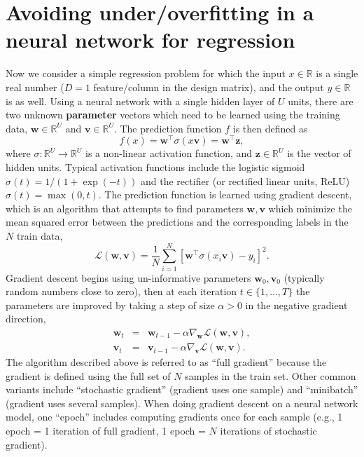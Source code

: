 \documentclass[12pt]{article}
\newcommand{\keyword}[1]{\textbf{#1}}
\begin{document}
\section{Avoiding under/overfitting in a neural network for regression}

Now we consider a simple regression problem for which the input
$x\in\mathbb R$ is a single real number ($D=1$ feature/column in the
design matrix), and the output $y\in\mathbb R$ is as well. Using a
neural network with a single hidden layer of $U$ units, there are two
unknown \keyword{parameter} vectors which need to be learned using the training
data, $\mathbf w\in \mathbb R^U$ and $\mathbf v\in \mathbb R^U$. The prediction
function $f$ is then defined as
\begin{equation}
  f(x) = \mathbf w^\intercal \sigma( x \mathbf v ) = \mathbf w^\intercal \mathbf z,
\end{equation}
where $\sigma:\mathbb R^U\rightarrow \mathbb R^U$ is a non-linear
activation function, and $\mathbf z\in \mathbb R^U$ is the vector of
hidden units. Typical activation functions include the logistic
sigmoid $\sigma(t)=1/(1+\exp(-t))$ and the rectifier (or rectified
linear units, ReLU) $\sigma(t)=\max(0, t)$. The prediction function is
learned using gradient descent, which is an algorithm that attempts to
find parameters $\mathbf w,\mathbf v$ which minimize the mean squared
error between the predictions and the corresponding labels in the $N$
train data,
\begin{equation}
  \mathcal L(\mathbf w, \mathbf v) = \frac{1}{N} \sum_{i=1}^N [ \mathbf w^\intercal \sigma( x_i \mathbf v ) - y_i ]^2. \label{eq:loss}
\end{equation}
Gradient descent begins using un-informative parameters
$\mathbf w_0,\mathbf v_0$ (typically random numbers close to zero),
then at each iteration $t\in\{1,\dots, T\}$ the parameters are
improved by taking a step of size $\alpha>0$ in the negative gradient
direction,
\begin{eqnarray}
  \mathbf w_t &=& \mathbf w_{t-1} - \alpha \nabla_{\mathbf w} \mathcal L(\mathbf w, \mathbf v),\\
  \mathbf v_t &=& \mathbf v_{t-1} - \alpha \nabla_{\mathbf v} \mathcal L(\mathbf w, \mathbf v).
\end{eqnarray}
The algorithm described above is referred to as ``full gradient''
because the gradient is defined using the full set of $N$ samples in
the train set. Other common variants include ``stochastic gradient''
(gradient uses one sample) and ``minibatch'' (gradient uses several
samples). When doing gradient descent on a neural network model, one
``epoch'' includes computing gradients once for each sample (e.g., 1
epoch = 1 iteration of full gradient, 1 epoch = $N$ iterations of
stochastic gradient).
\end{document}
